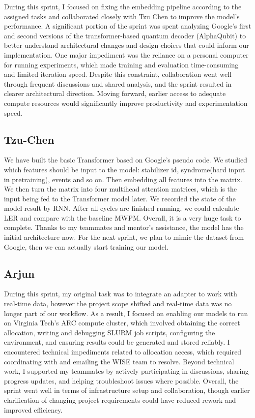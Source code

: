 \documentclass[12pt]{article}
\begin{document}
During this sprint, I focused on fixing the embedding pipeline according to the assigned 
tasks and collaborated closely with Tzu Chen to improve the model’s performance. A significant 
portion of the sprint was spent analyzing Google’s first and second versions of the 
transformer-based quantum decoder (AlphaQubit) to better understand architectural changes 
and design choices that could inform our implementation. One major impediment was the 
reliance on a personal computer for running experiments, which made training and evaluation 
time-consuming and limited iteration speed. Despite this constraint, collaboration went well 
through frequent discussions and shared analysis, and the sprint resulted in clearer 
architectural direction. Moving forward, earlier access to adequate compute resources 
would significantly improve productivity and experimentation speed.

\subsection*{Tzu-Chen}

We have built the basic Transformer based on Google’s pseudo code. We studied which features 
should be input to the model: stabilizer id, syndrome(hard input in pretraining), events and 
so on. Then embedding all features into the matrix. We then turn the matrix into four multihead 
attention matrices, which is the input being fed to the Transformer model later. We 
recorded the state of the model result by RNN. After all cycles are finished running, 
we could calculate LER and compare with the baseline MWPM. Overall, it is a very huge 
task to complete. Thanks to my teammates and mentor’s assistance, the model has the 
initial architecture now. For the next sprint, we plan to mimic the dataset from Google, 
then we can actually start training our model.

\subsection*{Arjun}

During this sprint, my original task was to integrate an adapter to work with real-time data, 
however the project scope shifted and real-time data was no longer part of our workflow. As a 
result, I focused on enabling our models to run on Virginia Tech’s ARC compute cluster, which 
involved obtaining the correct allocation, writing and debugging SLURM job scripts, configuring 
the environment, and ensuring results could be generated and stored reliably. I encountered 
technical impediments related to allocation access, which required coordinating with and 
emailing the WISE team to resolve. Beyond technical work, I supported my teammates by 
actively participating in discussions, sharing progress updates, and helping troubleshoot 
issues where possible. Overall, the sprint went well in terms of infrastructure setup 
and collaboration, though earlier clarification of changing project requirements could 
have reduced rework and improved efficiency.
\end{document}
